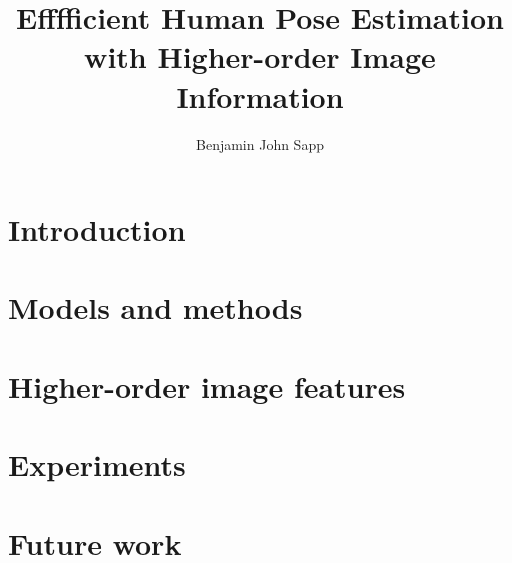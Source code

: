 \documentclass[12pt]{report}%
\begin{document}

\newcommand{\mytitle}{Efffficient Human Pose Estimation with Higher-order Image Information}
\newcommand{\MYTITLE}{EFFICIENT HUMAN POSE ESTIMATION WITH HIGHER-ORDER IMAGE INFORMATION}

\title{\mytitle}
\author{Benjamin John Sapp}


  
 \beforepreface
\newpage
\copyrightpage
{}

\newpage
\abstractp

\afterpreface
{}


\newpage
{}
\pagestyle{plain}

\part{Introduction}


\clearpage
\part{Models and methods}




\clearpage
\part{Higher-order image features}


\clearpage
\part{Experiments}

\clearpage
\part{Future work}


\clearpage


\end{document}
